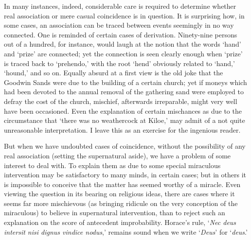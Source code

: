\documentclass[letterpaper,12pt,oneside,openany]{memoir}
\begin{document}
In many instances, indeed, considerable care is required
to determine whether real association or mere
casual coincidence is in question. It is surprising how,
in some cases, an association can be traced between
events seemingly in no way connected. One is reminded
of certain cases of derivation. Ninety-nine persons out
of a hundred, for instance, would laugh at the notion
that the words `hand' and `prize' are connected; yet
the connection is seen clearly enough when `prize' is
traced back to `prehendo,' with the root `hend' obviously
related to `hand,' `hound,' and so on. Equally
absurd at a first view is the old joke that the Goodwin
Sands were due to the building of a certain church; yet
if moneys which had been devoted to the annual removal
of the gathering sand were employed to defray
the cost of the church, mischief, afterwards irreparable,
might very well have been occasioned. Even the explanation
of certain mischances as due to the circumstance
that `there was no weathercock at Kiloe,' may
admit of a not quite unreasonable interpretation. I
leave this as an exercise for the ingenious reader.

But when we have undoubted cases of coincidence,
without the possibility of any real association (setting
the supernatural aside), we have a problem of some
interest to deal with. To explain them as due to some
special miraculous intervention may be satisfactory
to many minds, in certain cases; but in others it is
impossible to conceive that the matter has seemed
worthy of a miracle. Even viewing the question in its
bearing on religious ideas, there are cases where it
seems far more mischievous (as bringing ridicule on
the very conception of the miraculous) to believe in
supernatural intervention, than to reject such an explanation
on the score of antecedent improbability.
Horace's rule, `\textit{Nec deus intersit nisi dignus vindice
nodus},' remains sound when we write `\textit{Deus}' for
`\textit{deus}.'
\end{document}
